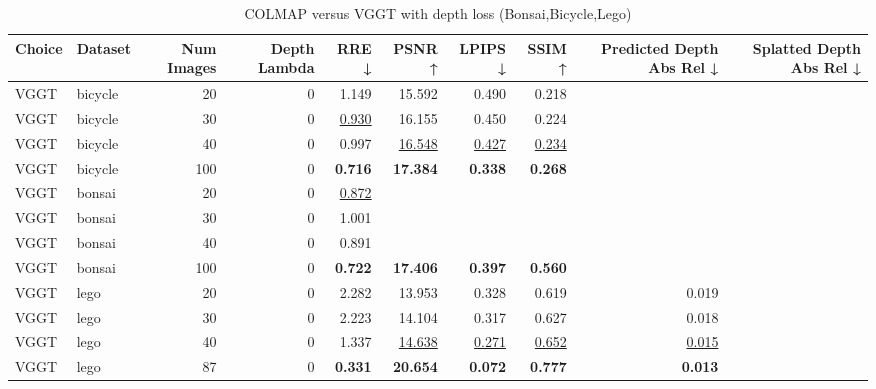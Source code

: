 \begin{table}[H]
\caption{COLMAP versus VGGT with depth loss (Bonsai,Bicycle,Lego)}
\label{tab:05_depth_lambda_num_images_bonsai,bicycle,lego}
\small
\begin{tabular}{llrrrrrrrr}
\toprule
Choice & Dataset & Num Images & Depth Lambda & RRE ↓ & PSNR ↑ & LPIPS ↓ & SSIM ↑ & Predicted Depth Abs Rel ↓ & Splatted Depth Abs Rel ↓ \\
\midrule
VGGT & bicycle & 20 & 0 & 1.149 & 15.592 & 0.490 & 0.218 &  &  \\
VGGT & bicycle & 30 & 0 & \underline{0.930} & 16.155 & 0.450 & 0.224 &  &  \\
VGGT & bicycle & 40 & 0 & 0.997 & \underline{16.548} & \underline{0.427} & \underline{0.234} &  &  \\
VGGT & bicycle & 100 & 0 & \textbf{0.716} & \textbf{17.384} & \textbf{0.338} & \textbf{0.268} &  &  \\
\midrule
VGGT & bonsai & 20 & 0 & \underline{0.872} &  &  &  &  &  \\
VGGT & bonsai & 30 & 0 & 1.001 &  &  &  &  &  \\
VGGT & bonsai & 40 & 0 & 0.891 &  &  &  &  &  \\
VGGT & bonsai & 100 & 0 & \textbf{0.722} & \textbf{17.406} & \textbf{0.397} & \textbf{0.560} &  &  \\
\midrule
VGGT & lego & 20 & 0 & 2.282 & 13.953 & 0.328 & 0.619 & 0.019 &  \\
VGGT & lego & 30 & 0 & 2.223 & 14.104 & 0.317 & 0.627 & 0.018 &  \\
VGGT & lego & 40 & 0 & 1.337 & \underline{14.638} & \underline{0.271} & \underline{0.652} & \underline{0.015} &  \\
VGGT & lego & 87 & 0 & \textbf{0.331} & \textbf{20.654} & \textbf{0.072} & \textbf{0.777} & \textbf{0.013} &  \\
\bottomrule
\end{tabular}
\end{table}